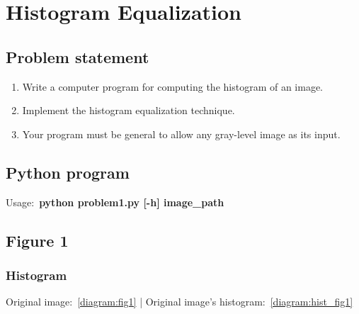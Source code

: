 \chapter{Histogram Equalization}

\section{Problem statement}

\begin{enumerate}
    \item Write a computer program for computing the histogram of an image.\\
    \item Implement the histogram equalization technique.\\
    \item Your program must be general to allow any gray-level image as its input.\\
\end{enumerate}

\section{Python program}

Usage:~\textbf{python problem1.py [-h] image\_path}

\section{Figure 1}


    \subsection{Histogram}

    Original image:~\ref{diagram:fig1} |
    Original image's histogram:~\ref{diagram:hist_fig1}


